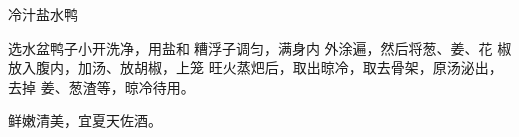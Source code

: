 \begin{recipe}{冷汁盐水鸭}

\ingredients


\preparation

\step 选水盆鸭子小开洗净，用盐和𫃑糟浮子调匀，满身内 外涂遍，然后将葱、姜、花
椒放入腹内，加汤、放胡椒，上笼 旺火蒸𤆵后，取出晾冷，取去骨架，原汤泌出，去掉
姜、葱渣等，晾冷待用。

\features

鲜嫩清美，宜夏天佐酒。

\end{recipe}

